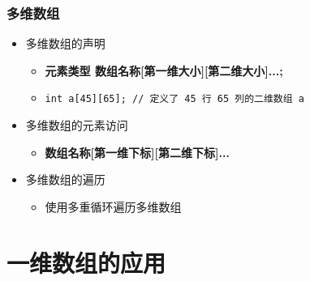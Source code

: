 \begin{frame}[fragile]
    \frametitle{多维数组}

    \begin{itemize}[<+->]
        \item 多维数组的声明

            \begin{itemize}
                \item \textbf{元素类型 \enspace 数组名称[第一维大小][第二维大小]...;}
                \item \lstinline|int a[45][65]; // 定义了 45 行 65 列的二维数组 a|
            \end{itemize}

        \item 多维数组的元素访问

            \begin{itemize}
                \item \textbf{数组名称[第一维下标][第二维下标]...}
            \end{itemize}

        \item 多维数组的遍历

            \begin{itemize}
                \item 使用多重循环遍历多维数组
            \end{itemize}

    \end{itemize}
\end{frame}


\section{一维数组的应用}

